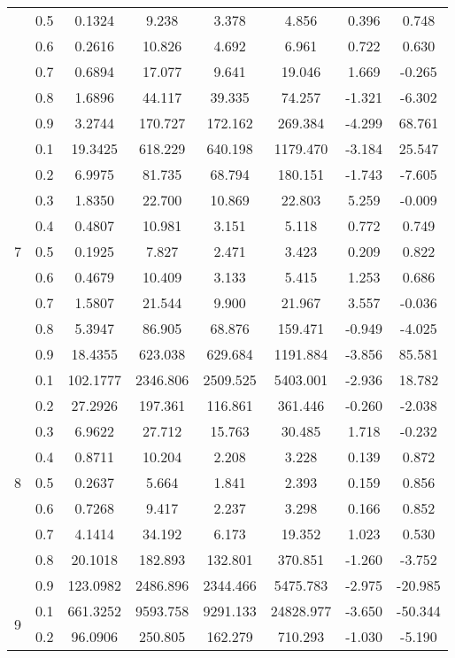 \documentclass[11pt,a4paper]{report}
\begin{document}
\begin{longtable}{ | c | c || c | c | c | c | c | c | }
 & 0.5 & 0.1324 & 9.238 & 3.378 & 4.856 & 0.396 & 0.748 \\
 & 0.6 & 0.2616 & 10.826 & 4.692 & 6.961 & 0.722 & 0.630 \\
 & 0.7 & 0.6894 & 17.077 & 9.641 & 19.046 & 1.669 & -0.265 \\
 & 0.8 & 1.6896 & 44.117 & 39.335 & 74.257 & -1.321 & -6.302 \\
 & 0.9 & 3.2744 & 170.727 & 172.162 & 269.384 & -4.299 & 68.761 \\
 \hline
\multirow{9}{*}{7} & 0.1 & 19.3425 & 618.229 & 640.198 & 1179.470 & -3.184 & 25.547 \\
 & 0.2 & 6.9975 & 81.735 & 68.794 & 180.151 & -1.743 & -7.605 \\
 & 0.3 & 1.8350 & 22.700 & 10.869 & 22.803 & 5.259 & -0.009 \\
 & 0.4 & 0.4807 & 10.981 & 3.151 & 5.118 & 0.772 & 0.749 \\
 & 0.5 & 0.1925 & 7.827 & 2.471 & 3.423 & 0.209 & 0.822 \\
 & 0.6 & 0.4679 & 10.409 & 3.133 & 5.415 & 1.253 & 0.686 \\
 & 0.7 & 1.5807 & 21.544 & 9.900 & 21.967 & 3.557 & -0.036 \\
 & 0.8 & 5.3947 & 86.905 & 68.876 & 159.471 & -0.949 & -4.025 \\
 & 0.9 & 18.4355 & 623.038 & 629.684 & 1191.884 & -3.856 & 85.581 \\
 \hline
\multirow{9}{*}{8} & 0.1 & 102.1777 & 2346.806 & 2509.525 & 5403.001 & -2.936 & 18.782 \\
 & 0.2 & 27.2926 & 197.361 & 116.861 & 361.446 & -0.260 & -2.038 \\
 & 0.3 & 6.9622 & 27.712 & 15.763 & 30.485 & 1.718 & -0.232 \\
 & 0.4 & 0.8711 & 10.204 & 2.208 & 3.228 & 0.139 & 0.872 \\
 & 0.5 & 0.2637 & 5.664 & 1.841 & 2.393 & 0.159 & 0.856 \\
 & 0.6 & 0.7268 & 9.417 & 2.237 & 3.298 & 0.166 & 0.852 \\
 & 0.7 & 4.1414 & 34.192 & 6.173 & 19.352 & 1.023 & 0.530 \\
 & 0.8 & 20.1018 & 182.893 & 132.801 & 370.851 & -1.260 & -3.752 \\
 & 0.9 & 123.0982 & 2486.896 & 2344.466 & 5475.783 & -2.975 & -20.985 \\
 \hline
\multirow{9}{*}{9} & 0.1 & 661.3252 & 9593.758 & 9291.133 & 24828.977 & -3.650 & -50.344 \\
 & 0.2 & 96.0906 & 250.805 & 162.279 & 710.293 & -1.030 & -5.190 \\

\end{longtable}
\end{document}
